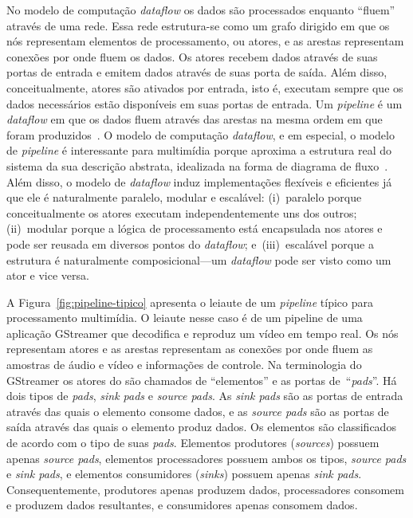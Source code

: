 \documentclass{SBCbookchapter}
\def\en#1{\foreignlanguage{english}{\emph{#1}}}
\begin{document}
No modelo de computação \en{dataflow} os dados são processados enquanto
``fluem'' através de uma rede.  Essa rede estrutura-se como um grafo
dirigido em que os nós representam elementos de processamento, ou atores, e
as arestas representam conexões por onde fluem os dados.  Os atores recebem
dados através de suas portas de entrada e emitem dados através de suas porta
de saída.  Além disso, conceitualmente, atores são ativados por entrada,
isto é, executam sempre que os dados necessários estão disponíveis em suas
portas de entrada.  Um \en{pipeline} é um \en{dataflow} em que os dados
fluem através das arestas na mesma ordem em que foram
produzidos~\cite{Kahn-G-1977,Lee-E-A-1995}.  O modelo de computação
\en{dataflow}, e em especial, o modelo de \en{pipeline} é interessante para
multimídia porque aproxima a estrutura real do sistema da sua descrição
abstrata, idealizada na forma de diagrama de fluxo~\cite{Yviquel-H-2014}.
Além disso, o modelo de \en{dataflow} induz implementações flexíveis e
eficientes já que ele é naturalmente paralelo, modular e escalável:
(i)~paralelo porque conceitualmente os atores executam independentemente uns
dos outros; (ii)~modular porque a lógica de processamento está encapsulada
nos atores e pode ser reusada em diversos pontos do \en{dataflow};
e~(iii)~escalável porque a estrutura é naturalmente composicional---um
\en{dataflow} pode ser visto como um ator e vice versa.

A Figura~\ref{fig:pipeline-tipico} apresenta o leiaute de um \en{pipeline}
típico para processamento multimídia.  O leiaute nesse caso é de um pipeline
de uma aplicação GStreamer que decodifica e reproduz um vídeo em tempo real.
Os nós representam atores e as arestas representam as conexões por onde
fluem as amostras de áudio e vídeo e informações de controle.  Na
terminologia do GStreamer os atores do são chamados de ``elementos'' e as
portas de~``\en{pads}''.  Há dois tipos de \en{pads}, \en{sink pads} e
\en{source pads}.  As \en{sink pads} são as portas de entrada através das
quais o elemento consome dados, e as \en{source pads} são as portas de saída
através das quais o elemento produz dados.  Os elementos são classificados
de acordo com o tipo de suas \en{pads}.  Elementos produtores (\en{sources})
possuem apenas \en{source pads}, elementos processadores possuem ambos os
tipos, \en{source pads} e \en{sink pads}, e elementos consumidores
(\en{sinks}) possuem apenas \en{sink pads}.  Consequentemente, produtores
apenas produzem dados, processadores consomem e produzem dados resultantes,
e consumidores apenas consomem dados.
\end{document}
